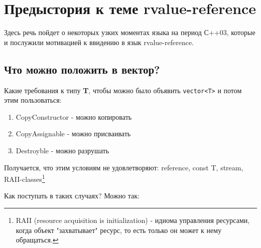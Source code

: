 \section{Предыстория к теме rvalue-reference}
Здесь речь пойдет о некоторых узких моментах языка на период С++03, которые и послужили мотивацией к ввидению в язык rvalue-reference.
\subsection{Что можно положить в вектор?}
Какие требования к типу {\bf T}, чтобы можно было объявить \texttt{vector<T>} и потом этим пользоваться:
\begin{enumerate}
\item CopyConstructor - можно копировать
\item CopyAssignable - можно присваивать
\item Destroyble - можно разрушать
\end{enumerate}
Получается, что этим условиям не удовлетворяют: reference, const T, stream, RAII-classes\footnote{ RAII (resource acquisition is initialization) - идиома управления ресурсами, когда объект "захватывает" ресурс, то есть только он может к нему обращаться.}


Как поступать в таких случаях? Можно так:

